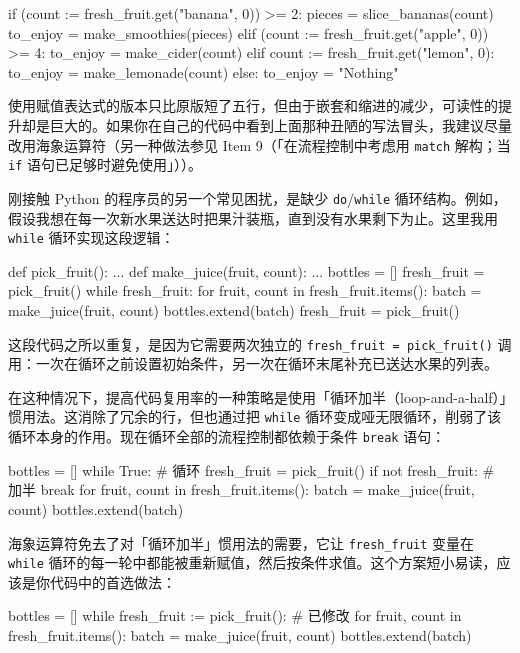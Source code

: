 \begin{codebox}[python]
if (count := fresh_fruit.get("banana", 0)) >= 2:
    pieces = slice_bananas(count)
    to_enjoy = make_smoothies(pieces)
elif (count := fresh_fruit.get("apple", 0)) >= 4:
    to_enjoy = make_cider(count)
elif count := fresh_fruit.get("lemon", 0):
    to_enjoy = make_lemonade(count)
else:
    to_enjoy = "Nothing"
\end{codebox}

使用赋值表达式的版本只比原版短了五行，但由于嵌套和缩进的减少，可读性的提升却是巨大的。如果你在自己的代码中看到上面那种丑陋的写法冒头，我建议尽量改用海象运算符（另一种做法参见 Item 9（「在流程控制中考虑用 \texttt{match} 解构；当 \texttt{if} 语句已足够时避免使用」））。

刚接触 Python 的程序员的另一个常见困扰，是缺少 \texttt{do}/\texttt{while} 循环结构。例如，假设我想在每一次新水果送达时把果汁装瓶，直到没有水果剩下为止。这里我用 \texttt{while} 循环实现这段逻辑：

\begin{codebox}[python]
def pick_fruit():
    ...
def make_juice(fruit, count):
    ...
bottles = []
fresh_fruit = pick_fruit()
while fresh_fruit:
    for fruit, count in fresh_fruit.items():
        batch = make_juice(fruit, count)
        bottles.extend(batch)
    fresh_fruit = pick_fruit()
\end{codebox}

这段代码之所以重复，是因为它需要两次独立的 \texttt{fresh\_fruit = pick\_fruit()} 调用：一次在循环之前设置初始条件，另一次在循环末尾补充已送达水果的列表。

在这种情况下，提高代码复用率的一种策略是使用「循环加半（loop-and-a-half）」惯用法。这消除了冗余的行，但也通过把 \texttt{while} 循环变成哑无限循环，削弱了该循环本身的作用。现在循环全部的流程控制都依赖于条件 \texttt{break} 语句：

\begin{codebox}[python]
bottles = []
while True:                     # 循环
    fresh_fruit = pick_fruit()
    if not fresh_fruit:         # 加半
        break
    for fruit, count in fresh_fruit.items():
        batch = make_juice(fruit, count)
        bottles.extend(batch)
\end{codebox}

海象运算符免去了对「循环加半」惯用法的需要，它让 \texttt{fresh\_fruit} 变量在 \texttt{while} 循环的每一轮中都能被重新赋值，然后按条件求值。这个方案短小易读，应该是你代码中的首选做法：

\begin{codebox}[python]
bottles = []
while fresh_fruit := pick_fruit():  # 已修改
    for fruit, count in fresh_fruit.items():
        batch = make_juice(fruit, count)
        bottles.extend(batch)
\end{codebox}

